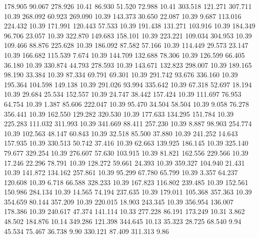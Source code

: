  178.905   90.067  278.926        10.41
  86.930   51.520   72.988        10.41
 303.518  121.271  307.711        10.39
 268.092   60.923  269.090        10.39
 143.373   30.650   22.087        10.39
   9.687  113.016  224.432        10.39
 171.991  120.443   57.533        10.39
 191.438  131.271  103.916        10.39
 184.349   96.706   23.057        10.39
 322.870  149.683  158.101        10.39
 223.221  109.034  304.953        10.39
 109.466   88.876  225.628        10.39
 186.092   87.582   57.166        10.39
 114.449   29.573   23.147        10.39
 166.682  115.539    7.674        10.39
 144.709  132.688   78.306        10.39
 126.599   66.405   36.180        10.39
 330.874   44.793  278.593        10.39
 143.671  132.823  298.007        10.39
 189.165   98.190   33.384        10.39
  87.334   69.791   69.301        10.39
 291.742   93.676  336.160        10.39
 195.364  104.598  149.138        10.39
 291.026   93.994  335.642        10.39
  67.318   52.697   18.194        10.39
  29.684   25.534  152.557        10.39
  24.747   38.442  157.424        10.39
 111.697   76.953   64.754        10.39
   1.387   85.606  222.047        10.39
  95.470   34.504   58.504        10.39
   9.058   76.278  356.441        10.39
 162.550  129.282  320.530        10.39
 177.633  134.295  151.784        10.39
 225.283  111.032  311.993        10.39
 341.669   88.411  257.230        10.39
   8.887   98.903  254.774        10.39
 102.563   48.147   60.843        10.39
  32.518   85.500   37.880        10.39
 241.252   14.643  157.935        10.39
 330.513   50.742   37.416        10.39
  62.663  139.925  186.145        10.39
 325.140   79.677  329.254        10.39
 276.607   57.630  103.915        10.39
  81.821  162.556  229.566        10.39
  17.246   22.296   78.791        10.39
 128.272   59.661   24.393        10.39
 359.327  104.940   21.431        10.39
 141.872  134.162  257.861        10.39
  95.299   67.780   65.799        10.39
   3.357   64.237  120.608        10.39
   6.718   66.588  328.233        10.39
 167.823  116.802  239.485        10.39
 152.561  150.986  284.134        10.39
  14.565   74.194  237.635        10.39
 179.011  105.368  357.363        10.39
 354.659   80.144  357.209        10.39
 220.015   18.903  243.345        10.39
 356.954  136.007  178.386        10.39
 240.617   47.374  141.114        10.33
 277.228   86.191  173.249        10.31
   3.862   48.502  184.876        10.14
 349.286  121.398  344.645        10.13
  35.323   28.725   68.540         9.94
  45.534   75.467   36.738         9.90
 330.121   87.409  311.313         9.86
